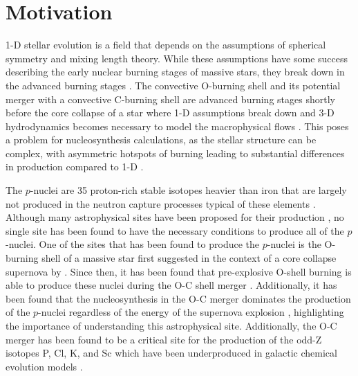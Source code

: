 \section{Motivation}

1-D stellar evolution is a field that depends on the assumptions of spherical symmetry and mixing length theory.
While these assumptions have some success describing the early nuclear burning stages of massive stars, they break down in the advanced burning stages \citep{bazanConvectionNucleosynthesisCore1994}.
The convective O-burning shell and its potential merger with a convective C-burning shell are advanced burning stages shortly before the core collapse of a star where 1-D assumptions break down and 3-D hydrodynamics becomes necessary to model the macrophysical flows \citep{meakinTurbulentConvectionStellar2007, jonesIdealizedHydrodynamicSimulations2017, andrassy3DHydrodynamicSimulations2020}.
This poses a problem for nucleosynthesis calculations, as the stellar structure can be complex, with asymmetric hotspots of burning leading to substantial differences in production compared to 1-D \citep{bazanConvectionNucleosynthesisCore1994, rizzutiShellMergersLate2024a}.

The $p$-nuclei are 35 proton-rich stable isotopes heavier than iron that are largely not produced in the neutron capture processes typical of these elements \citep{burbidgeSynthesisElementsStars1957,woosleyPprocessesSupernovae1978}.
Although many astrophysical sites have been proposed for their production \citep{woosleyAlphaProcessRProcess1992, schatzRpprocessNucleosynthesisExtreme1998, rauscherNucleosynthesisMassiveStars2002, travaglioTestingRoleSNe2015}, no single site has been found to have the necessary conditions to produce all of the $p$-nuclei.
One of the sites that has been found to produce the $p$-nuclei is the O-burning shell of a massive star first suggested in the context of a core collapse supernova by \citep{woosleyPprocessesSupernovae1978}. 
Since then, it has been found that pre-explosive O-shell burning is able to produce these nuclei during the O-C shell merger \citep{rauscherNucleosynthesisMassiveStars2002,ritterConvectivereactiveNucleosynthesisSc2018,robertiGprocessNucleosynthesisCorecollapse2023}.
Additionally, it has been found that the nucleosynthesis in the O-C merger dominates the production of the $p$-nuclei regardless of the energy of the supernova explosion \citep{robertiGprocessNucleosynthesisCorecollapse2024b}, highlighting the importance of understanding this astrophysical site.
Additionally, the O-C merger has been found to be a critical site for the production of the odd-Z isotopes P, Cl, K, and Sc which have been underproduced in galactic chemical evolution models \citep{ritterConvectivereactiveNucleosynthesisSc2018, robertiOccurrenceImpactCarbonOxygen2025}.

